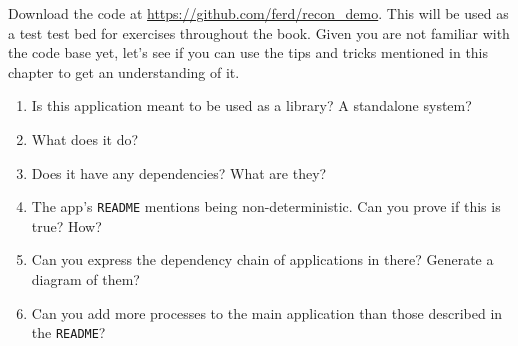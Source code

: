 \documentclass[11pt, oneside]{book}   	%
\newcommand{\filename}[1]{\Verb`#1`}
\begin{document}
Download the code at \href{https://github.com/ferd/recon\_demo}{https://github.com/ferd/recon\_demo}. This will be used as a test test bed for exercises throughout the book. Given you are not familiar with the code base yet, let's see if you can use the tips and tricks mentioned in this chapter to get an understanding of it.

\begin{enumerate}
	\item Is this application meant to be used as a library? A standalone system?
	\item What does it do?
	\item Does it have any dependencies? What are they?
	\item The app's \filename{README} mentions being non-deterministic. Can you prove if this is true? How?
	\item Can you express the dependency chain of applications in there? Generate a diagram of them?
	\item Can you add more processes to the main application than those described in the \filename{README}? 
\end{enumerate}

\end{document}
